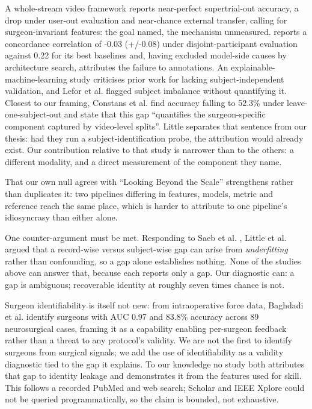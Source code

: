 A whole-stream video framework \cite{chen2026interpretable} reports near-perfect supertrial-out accuracy, a drop under user-out evaluation and near-chance external transfer, calling for surgeon-invariant features: the goal named, the mechanism unmeasured. \cite{hoffmann2026looking} reports a concordance correlation of -0.03 (+/-0.08) under disjoint-participant evaluation against 0.22 for its best baselines and, having excluded model-side causes by architecture search, attributes the failure to annotations. An explainable-machine-learning study \cite{xuan2026explainable} criticises prior work for lacking subject-independent validation, and Lefor et al. \cite{lefor2020motion} flagged subject imbalance without quantifying it. Closest to our framing, Constans et al. \cite{constans2026markerless} find accuracy falling to 52.3\% under leave-one-subject-out and state that this gap ``quantifies the surgeon-specific component captured by video-level splits''. Little separates that sentence from our thesis: had they run a subject-identification probe, the attribution would already exist. Our contribution relative to that study is narrower than to the others: a different modality, and a direct measurement of the component they name.

That our own null agrees with ``Looking Beyond the Scale'' strengthens rather than duplicates it: two pipelines differing in features, models, metric and reference reach the same place, which is harder to attribute to one pipeline's idiosyncrasy than either alone.

One counter-argument must be met. Responding to Saeb et al. \cite{saeb2017need}, Little et al. \cite{little2017using} argued that a record-wise versus subject-wise gap can arise from \textit{underfitting} rather than confounding, so a gap alone establishes nothing. None of the studies above can answer that, because each reports only a gap. Our diagnostic can: a gap is ambiguous; recoverable identity at roughly seven times chance is not.

Surgeon identifiability is itself not new: from intraoperative force data, Baghdadi et al. \cite{baghdadi2023force} identify surgeons with AUC 0.97 and 83.8\% accuracy across 89 neurosurgical cases, framing it as a capability enabling per-surgeon feedback rather than a threat to any protocol's validity. We are not the first to identify surgeons from surgical signals; we add the use of identifiability as a validity diagnostic tied to the gap it explains. To our knowledge no study both attributes that gap to identity leakage and demonstrates it from the features used for skill. This follows a recorded PubMed and web search; Scholar and IEEE Xplore could not be queried programmatically, so the claim is bounded, not exhaustive.

